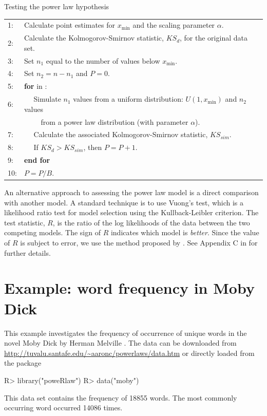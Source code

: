 \documentclass[article]{jss}
\newcommand{\xmin}{x_{\min}}
\begin{document}
\begin{algorithm}[t]
  \caption{Testing the power law hypothesis \citep{Clauset2009}}\label{A2}
  \begin{tabular}{@{}ll@{}}
    {\small 1:} & Calculate point estimates for $\xmin$ and the scaling parameter $\alpha$. \\
    {\small 2:} & Calculate the Kolmogorov-Smirnov statistic, $KS_d$, for the original data set.\\
    {\small 3:} & Set $n_1$ equal to the number of values below $\xmin$. \\
    {\small 4:} & Set $n_2 = n - n_1$ and $P = 0$.\\
    {\small 5:} & \textbf{for} \code{i} in \code{1:B}:\\
    {\small 6:} & $\quad$ Simulate $n_1$ values from a uniform distribution:
    $U(1, \xmin)$ and $n_2$ values  \\
    &$\qquad$  from a  power law distribution (with parameter $\alpha$).\\
    {\small 7:} & $\quad$ Calculate the associated Kolmogorov-Smirnov statistic, $KS_{sim}$.\\
    {\small 8:} & $\quad$ If $KS_d > KS_{sim}$, then $P = P + 1$.\\
    {\small 9:} & \textbf{end for} \\
    {\small 10:} & $P= P/B$.\\
  \end{tabular}
\end{algorithm}

An alternative  approach to assessing the power law model is a direct comparison with
another model. A standard technique is to use Vuong's test, which is a
likelihood ratio test for model selection using the Kullback-Leibler criterion.
The test statistic, $R$, is the ratio of the log likelihoods of the data between
the two competing models. The sign of $R$ indicates which model is
\textit{better}. Since the value of $R$ is subject to error, we use the method
proposed by \cite{Vuong1989}. See Appendix C in \cite{Clauset2009} for further
details.



\section{Example: word frequency in Moby Dick}

This example investigates the frequency of occurrence of unique words in the
novel Moby Dick by Herman Melville \citep{Clauset2009,Newman2005}. The data can
be downloaded from
\url{http://tuvalu.santafe.edu/~aaronc/powerlaws/data.htm}
or directly loaded from the  package 
\begin{Schunk}
\begin{Sinput}
R> library("poweRlaw")
R> data("moby")
\end{Sinput}
\end{Schunk}
This data set contains the frequency of 18855 words. The most
commonly occurring word occurred 14086 times.
\end{document}
